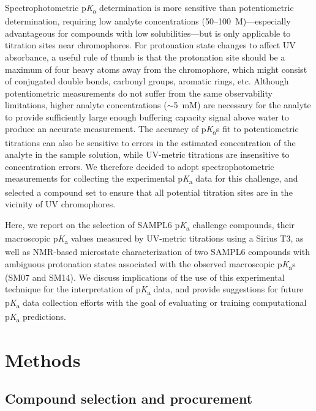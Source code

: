 \documentclass[9pt,lineno]{elife}
\newcommand{\pKa}{p\textit{K}\textsubscript{a}}
\begin{document}
Spectrophotometric \pKa{} determination is more sensitive than potentiometric determination, requiring low analyte concentrations (50--100~\micro{}M)---especially advantageous for compounds with low solubilities---but is only applicable to titration sites near chromophores. 
For protonation state changes to affect UV absorbance, a useful rule of thumb is that the protonation site should be a maximum of four heavy atoms away from the chromophore, which might consist of conjugated double bonds, carbonyl groups, aromatic rings, etc.
Although potentiometric measurements do not suffer from the same observability limitations, higher analyte concentrations ($\sim$5~mM) are necessary for the analyte to provide sufficiently large enough buffering capacity signal above water to produce an accurate measurement. 
The accuracy of \pKa{}s fit to potentiometric titrations can also be sensitive to errors in the estimated concentration of the analyte in the sample solution, while UV-metric titrations are insensitive to concentration errors.
We therefore decided to adopt spectrophotometric measurements for collecting the experimental \pKa{} data for this challenge, and selected a compound set to ensure that all potential titration sites are in the vicinity of UV chromophores.

Here, we report on the selection of SAMPL6 \pKa{} challenge compounds, their macroscopic \pKa{} values measured by UV-metric titrations using a Sirius T3, as well as NMR-based microstate characterization of two SAMPL6 compounds with ambiguous protonation states associated with the observed macroscopic \pKa{}s (SM07 and SM14). 
We discuss implications of the use of this experimental technique for the interpretation of \pKa{} data, and provide suggestions for future \pKa{} data collection efforts with the goal of evaluating or training computational \pKa{} predictions.

\section{Methods}

\subsection{Compound selection and procurement}
\end{document}
